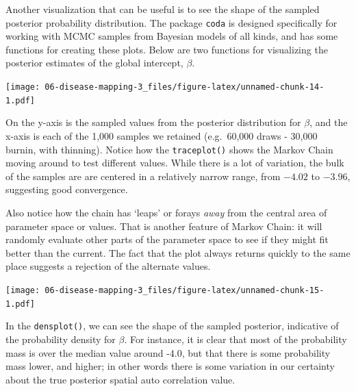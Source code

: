 \documentclass[
]{book}
\newenvironment{Shaded}{\begin{snugshade}}{\end{snugshade}}
\newcommand{\FunctionTok}[1]{\textcolor[rgb]{0.00,0.00,0.00}{#1}}
\newcommand{\NormalTok}[1]{#1}
\newcommand{\SpecialCharTok}[1]{\textcolor[rgb]{0.00,0.00,0.00}{#1}}
\begin{document}
Another visualization that can be useful is to see the shape of the sampled posterior probability distribution. The package \texttt{coda} is designed specifically for working with MCMC samples from Bayesian models of all kinds, and has some functions for creating these plots. Below are two functions for visualizing the posterior estimates of the global intercept, \(\beta\).

\begin{Shaded}
\end{Shaded}

\texttt{[image: 06-disease-mapping-3\_files/figure-latex/unnamed-chunk-14-1.pdf]}

On the y-axis is the sampled values from the posterior distribution for \(\beta\), and the x-axis is each of the 1,000 samples we retained (e.g.~60,000 draws - 30,000 burnin, with thinning). Notice how the \texttt{traceplot()} shows the Markov Chain moving around to test different values. While there is a lot of variation, the bulk of the samples are are centered in a relatively narrow range, from \(-4.02\) to \(-3.96\), suggesting good convergence.

Also notice how the chain has `leaps' or forays \emph{away} from the central area of parameter space or values. That is another feature of Markov Chain: it will randomly evaluate other parts of the parameter space to see if they might fit better than the current. The fact that the plot always returns quickly to the same place suggests a rejection of the alternate values.

\begin{Shaded}
\end{Shaded}

\texttt{[image: 06-disease-mapping-3\_files/figure-latex/unnamed-chunk-15-1.pdf]}

In the \texttt{densplot()}, we can see the shape of the sampled posterior, indicative of the probability density for \(\beta\). For instance, it is clear that most of the probability mass is over the median value around -4.0, but that there is some probability mass lower, and higher; in other words there is some variation in our certainty about the true posterior spatial auto correlation value.
\end{document}
